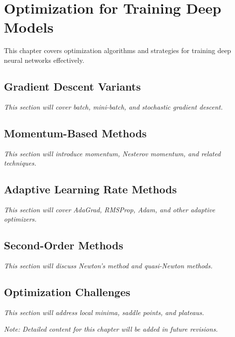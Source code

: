 
\chapter{Optimization for Training Deep Models}
\label{chap:optimization}

This chapter covers optimization algorithms and strategies for training deep neural networks effectively.

\section{Gradient Descent Variants}

\textit{This section will cover batch, mini-batch, and stochastic gradient descent.}

\section{Momentum-Based Methods}

\textit{This section will introduce momentum, Nesterov momentum, and related techniques.}

\section{Adaptive Learning Rate Methods}

\textit{This section will cover AdaGrad, RMSProp, Adam, and other adaptive optimizers.}

\section{Second-Order Methods}

\textit{This section will discuss Newton's method and quasi-Newton methods.}

\section{Optimization Challenges}

\textit{This section will address local minima, saddle points, and plateaus.}

\vspace{1em}
\noindent\textit{Note: Detailed content for this chapter will be added in future revisions.}
